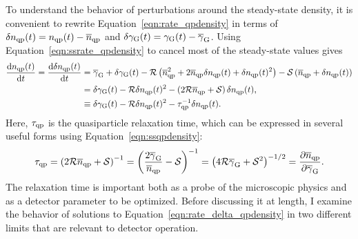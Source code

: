 To understand the behavior of perturbations around the steady-state density, it is convenient to rewrite Equation~\ref{eqn:rate_qpdensity} in terms of 
$\delta n_{\mathrm{qp}}(t) = n_{\mathrm{qp}}(t) - \overline{n}_{\mathrm{qp}}$
and
$\delta\gamma_{\mathrm{G}}(t) = \gamma_{\mathrm{G}}(t) - \overline{\gamma}_{\mathrm{G}}$.
Using Equation~\ref{eqn:ssrate_qpdensity} to cancel most of the steady-state values gives
\begin{align}
\begin{split}
\dv{n_{\mathrm{qp}}(t)}{t}
  =
  \dv{\delta n_{\mathrm{qp}}(t)}{t}
  &=
  \overline{\gamma}_{\mathrm{G}} + \delta\gamma_{\mathrm{G}}(t)
  -
  \mathcal{R} \left(\overline{n}_{\mathrm{qp}}^2 + 2 \overline{n}_{\mathrm{qp}} \delta n_{\mathrm{qp}}(t) + \delta n_{\mathrm{qp}}(t)^2 \right)
  - \mathcal{S} \left( \overline{n}_{\mathrm{qp}} + \delta n_{\mathrm{qp}}(t) \right) \\
  &=
  \delta \gamma_{\mathrm{G}}(t)
  - \mathcal{R} \delta n_{\mathrm{qp}}(t)^2
  - \left(2 \mathcal{R} \overline{n}_{\mathrm{qp}} + \mathcal{S} \right) \delta n_{\mathrm{qp}}(t), \\
  &\equiv
  \delta \gamma_{\mathrm{G}}(t)
  - \mathcal{R} \delta n_{\mathrm{qp}}(t)^2
  - \tau_{\mathrm{qp}}^{-1} \delta n_{\mathrm{qp}}(t).
\end{split}
\label{eqn:rate_delta_qpdensity}
\end{align}
Here, $\tau_{\mathrm{qp}}$ is the quasiparticle relaxation time, which can be expressed in several useful forms using Equation~\ref{eqn:ssqpdensity}:
\begin{equation}
\tau_{\mathrm{qp}}
  =
  \left( 2 \mathcal{R} \overline{n}_{\mathrm{qp}} + \mathcal{S} \right)^{-1}
  =
  \left( \frac{2 \overline{\gamma}_{\mathrm{G}}}{\overline{n}_{\mathrm{qp}}} - \mathcal{S} \right)^{-1}
  =
  \left( 4 \mathcal{R} \overline{\gamma}_{\mathrm{G}} + \mathcal{S}^2 \right)^{-1/2}
  =
  \pdv{\overline{n}_{\mathrm{qp}}}{\overline{\gamma}_{\mathrm{G}}}.
\label{eqn:qprelaxationtime}
\end{equation}
The relaxation time is important both as a probe of the microscopic physics and as a detector parameter to be optimized.
Before discussing it at length, I examine the behavior of solutions to Equation~\ref{eqn:rate_delta_qpdensity} in two different limits that are relevant to detector operation.

